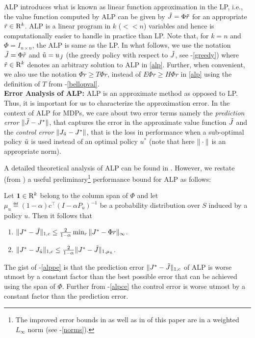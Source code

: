 ALP introduces what is known as linear function approximation in the LP, i.e., the value function computed by ALP can be given by $\tilde{J}=\Phi \tilde{r}$ for an appropriate $\tilde{r}\in \mathrm{R}^k$. ALP is a linear program in $k$ ($<<n$) variables and hence is computationally easier to handle in practice than LP. Note that, for $k=n$ and $\Phi=I_{n\times n}$, the ALP is same as the LP. In what follows, we use the notation $\tilde{J}=\Phi \tilde{r}$ and $\tilde{u}=u_{\tilde{J}}$ (the greedy policy with respect to $\tilde{J}$, see -\eqref{greedy}) where $\tilde{r}\in\mathrm{R}^k$ denotes an arbitrary solution to ALP in \eqref{alp}. Further, when convenient, we also use the notation $\Phi r \geq T\Phi r$, instead of $E\Phi r\geq H \Phi r$ in \eqref{alp} using the definition of $T$ from -\eqref{bellopval}.\\
\textbf{Error Analysis of ALP:} ALP is an approximate method as opposed to LP. Thus, it is important for us to characterize the approximation error. In the context of ALP for MDPs, we care about two error terms namely the \emph{prediction error} $\|\tilde{J}-J^*\|$, that captures the error in the approximate value function $\tilde{J}$ and the \emph{control error} $\|J_{\tilde{u}}-J^*\|$, that is the loss in performance when a sub-optimal policy $\tilde{u}$ is used instead of an optimal policy $u^*$ (note that here $\|\cdot\|$ is an appropriate norm).\par
A detailed theoretical analysis of ALP can be found in \cite{ALP}. However, we restate (from \cite{ALP}) a useful preliminary\footnote{The improved error bounds in \cite{ALP} as well as in  of this paper are in a weighted $L_\infty$ norm (see -\eqref{norms}).} performance bound for ALP as follows:
\begin{theorem}\label{alpvanilla}
Let $\mathbf{1}\in \mathrm{R}^k$ belong to the column span of $\Phi$ and let $\mu_u\eqdef (1-\alpha)c^\top(I-\alpha P_u)^{-1}$ be a probability distribution over $S$ induced by a policy $u$. Then it follows that
\begin{enumerate}
\item\label{alppe} $\|J^*-\tilde{J}\|_{1,c}\leq \frac{2}{1-\alpha}\min_{r}\|J^*-\Phi r\|_\infty$.
\item\label{alpce} $\|J^*-J_{\tilde{u}}\|_{1,c}\leq \frac{2}{1-\alpha}\|J^*-\tilde{J}\|_{1,\mu_{\tilde{u}}}$.
\end{enumerate}
\end{theorem}
The gist of -\eqref{alppe} is that the prediction error $\|J^*-\tilde{J}\|_{1,c}$ of ALP is worse utmost by a constant factor than the best possible error that can be achieved using the span of $\Phi$. Further from -\eqref{alpce} the control error is worse utmost by a constant factor than the prediction error.\\
